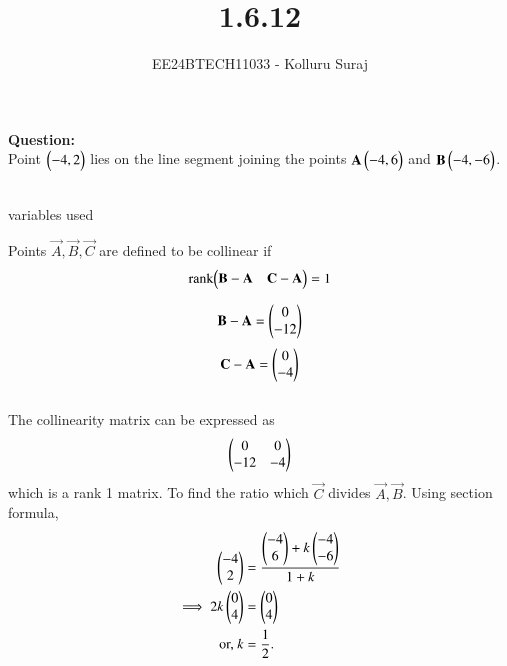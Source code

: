 \documentclass[journal]{IEEEtran}
\begin{document}

\vspace{3cm}

\title{1.6.12}
\author{EE24BTECH11033 - Kolluru Suraj}
{\let\newpage\relax\maketitle}
\renewcommand{\thefigure}{\theenumi}
\renewcommand{\thetable}{\theenumi}
\setlength{\intextsep}{10pt} %
\renewcommand{\thetable}{\theenumi}
\textbf{Question:}\\
Point $ \begin{pmatrix}-4, 2\end{pmatrix}$ lies on the line segment joining the points $\mathbf{A}\begin{pmatrix}-4, 6\end{pmatrix}$  and  $\mathbf{B}\begin{pmatrix}-4, -6\end{pmatrix}$.
\\
\solution\\
\begin{table}[h!]
  \centering
  
  \caption{variables used}
  \label{tabQuestion-1.6.12}
\end{table}


Points $\vec{A}, \vec{B}, \vec{C}$ are defined to be collinear if 
		\begin{align}
			\label{eq:line-rank-2}
			\text{rank}{\ensuremath{\begin{pmatrix}\mathbf{B}-\mathbf{A}& \mathbf{C}-\mathbf{A}\end{pmatrix}}} = 1
		\end{align}

  \begin{align}
 \mathbf{B}-\mathbf{A}=\begin{pmatrix} 0\\ -12\end{pmatrix}
\end{align}
\begin{align}
 \mathbf{C}-\mathbf{A}=\begin{pmatrix} 0\\ -4\end{pmatrix}
\end{align}\\
The collinearity matrix can be expressed as
 \begin{align}
			    \begin{pmatrix}0 & 0\\-12 & -4 \end{pmatrix}  
\end{align}
which is a rank 1 matrix.
To find the ratio which $\vec{C}$ divides $\vec{A},\vec{B}$. Using section formula,
\begin{align}
         \begin{pmatrix}-4\\2\end{pmatrix} &=\frac{{\begin{pmatrix}-4\\6\end{pmatrix}+k\begin{pmatrix}-4\\-6\end{pmatrix}}}{1+k}\\
	 \implies 2k\begin{pmatrix}0 \\ 4\end{pmatrix} &=\begin{pmatrix}0 \\ 4\end{pmatrix}
	 \\
	 \text{or, } k &= \frac{1}{2}.
\end{align}
\end{document}
